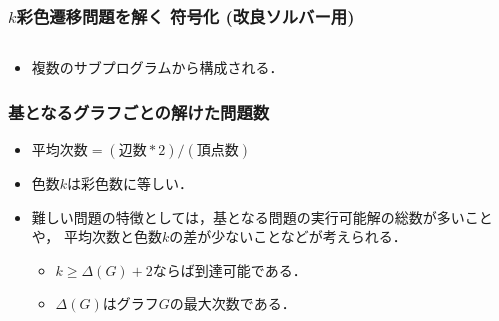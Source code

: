 \begin{frame}[shrink]
  \frametitle{$k$彩色遷移問題を解く 符号化 {\small(改良ソルバー用)}}

\begin{columns}[t]
\begin{column}{0.9\linewidth}
\begin{exampleblock}{}
 
\end{exampleblock}    
\end{column}
\end{columns}

\begin{itemize}
  \item 複数のサブプログラムから構成される．
\end{itemize}
\end{frame}
\begin{frame}[shrink]
  \frametitle{基となるグラフごとの解けた問題数}
  
  \begin{exampleblock}{}
    \centering
    \scalebox{0.8}{}
  \end{exampleblock}
  \begin{itemize}
    \item $\textrm{平均次数} = (\textrm{辺数}*2) / (\textrm{頂点数})$
    \item 色数$k$は彩色数に等しい．
    \item 難しい問題の特徴としては，基となる問題の実行可能解の総数が多いことや，
      平均次数と色数$k$の差が少ないことなどが考えられる．
      \begin{itemize}
        \item $k \ge \Delta(G) + 2$ならば到達可能である．
        \item $\Delta(G)$はグラフ$G$の最大次数である．
      \end{itemize}
  \end{itemize}
\end{frame}
